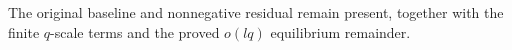 The original baseline and nonnegative residual remain
present, together with the finite $q$-scale terms and
the proved $o(lq)$ equilibrium remainder.